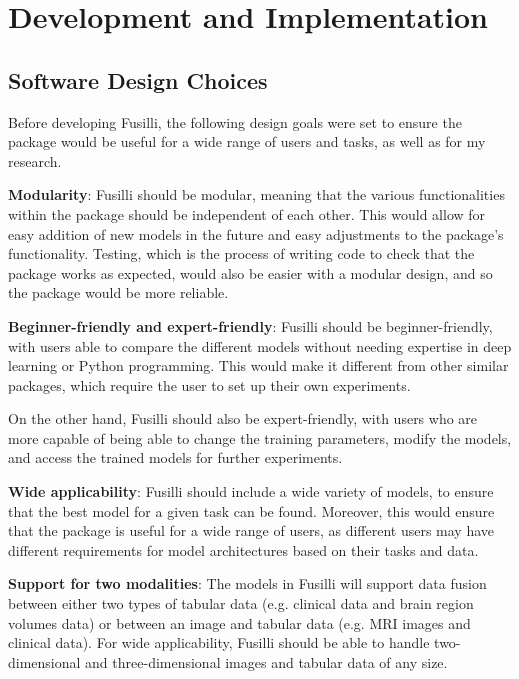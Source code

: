 \section{Development and Implementation}

\subsection{Software Design Choices}

Before developing Fusilli, the following design goals were set to ensure the package would be useful for a wide range of users and tasks, as well as for my research.
\vspace{0.3cm}

\noindent\textbf{Modularity}: Fusilli should be modular, meaning that the various functionalities within the package should be independent of each other.
This would allow for easy addition of new models in the future and easy adjustments to the package's functionality.
Testing, which is the process of writing code to check that the package works as expected, would also be easier with a modular design, and so the package would be more reliable.

\vspace{0.3cm}

\noindent\textbf{Beginner-friendly and expert-friendly}:  Fusilli should be beginner-friendly, with users able to compare the different models without needing expertise in deep learning or Python programming.
This would make it different from other similar packages, which require the user to set up their own experiments.

On the other hand, Fusilli should also be expert-friendly, with users who are more capable of being able to change the training parameters, modify the models, and access the trained models for further experiments.

\vspace{0.3cm}

\noindent\textbf{Wide applicability}:
Fusilli should include a wide variety of models, to ensure that the best model for a given task can be found.
Moreover, this would ensure that the package is useful for a wide range of users, as different users may have different requirements for model architectures based on their tasks and data.

\vspace{0.3cm}

\noindent\textbf{Support for two modalities}: The models in Fusilli will support data fusion between either two types of tabular data (e.g. clinical data and brain region volumes data) or between an image and tabular data (e.g. MRI images and clinical data).
For wide applicability, Fusilli should be able to handle two-dimensional and three-dimensional images and tabular data of any size.

